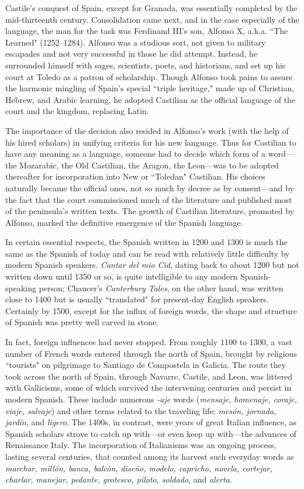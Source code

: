 Castile's conquest of Spain, except for Granada, was essentially completed by the mid-thirteenth century. Consolidation came
next, and in the case especially of the language, the man for the task
was Ferdinand III's son, Alfonso X, a.k.a. ``The Learned" (1252--1284).
Alfonso was a studious sort, not given to military escapades and not
very successful in those he did attempt. Instead, he surrounded himself
with sages, scientists, poets, and historians, and set up his court at Toledo as a patron of scholarship. Though Alfonso took pains to assure
the harmonic mingling of Spain's special ``triple heritage," made up of
Christian, Hebrew, and Arabic learning, he adopted Castilian as the official language of the court and the kingdom, replacing Latin.

The importance of the decision also resided in Alfonso's work
(with the help of his hired scholars) in unifying criteria for his new language. Thus for Castilian to have any meaning as a language, someone
had to decide which form of a word---the Mozarabic, the Old Castilian,
the Aragon, the Leon---was to be adopted thereafter for incorporation
into New or ``Toledan" Castilian. His choices naturally became the official ones, not so much by decree as by consent---and by the fact that
the court commissioned much of the literature and published most of
the peninsula's written texts. The growth of Castilian literature, promoted by Alfonso, marked the definitive emergence of the Spanish
language.

In certain essential respects, the Spanish written in 1200 and
1300 is much the same as the Spanish of today and can be read with
relatively little difficulty by modern Spanish speakers. \emph{Cantar del mio
Cid}, dating back to about 1200 but not written down until 1350 or so,
is quite intelligible to any modern Spanish-speaking person; Chaucer's
\emph{Canterbury Tales}, on the other hand, was written close to 1400 but
is usually ``translated" for present-day English speakers. Certainly by
1500, except for the influx of foreign words, the shape and structure of
Spanish was pretty well carved in stone.

In fact, foreign influences had never stopped. From roughly
1100 to 1300, a vast number of French words entered through the
north of Spain, brought by religious ``tourists" on pilgrimage to Santiago de Compostela in Galicia. The route they took across the north
of Spain, through Navarre, Castile, and Leon, was littered with Gallicisms, some of which survived the intervening centuries and persist in
modern Spanish. These include numerous \emph{-aje} words (\emph{mensaje, homenaje, coraje, viaje, salvaje}) and other terms related to the traveling life:
\emph{mesón, jornada, jardín}, and \emph{ligero}. The 1400s, in contrast, were years
of great Italian influence, as Spanish scholars strove to catch up with---or even keep up with---the advances of Renaissance Italy. The incorporation of Italianisms was an ongoing process, lasting several centuries,
that counted among its harvest such everyday words as \emph{marchar, millón, banca, balcón, diseño, modelo, capricho, novela, cortejar, charlar,
manejar, pedante, grotesco, piloto, soldado}, and \emph{alerta}.

